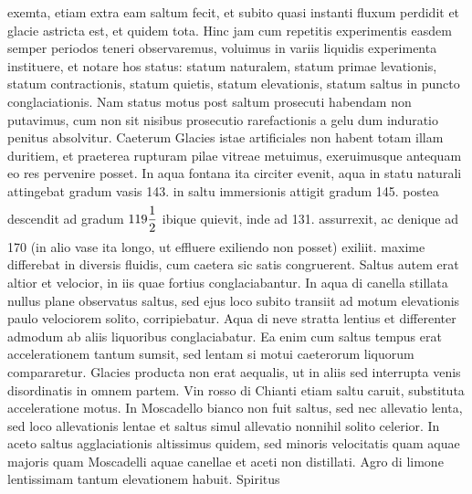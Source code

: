  exemta, etiam extra eam saltum fecit, et subito quasi instanti  fluxum perdidit et glacie astricta est, et quidem tota. Hinc jam cum  repetitis experimentis easdem semper periodos teneri observaremus, voluimus  in variis liquidis experimenta instituere, et notare hos status: statum naturalem\protect{},  statum primae levationis, statum contractionis, statum quietis, statum elevationis, statum saltus in puncto conglaciationis. Nam status motus post saltum prosecuti  habendam non putavimus, cum non sit nisibus prosecutio  rarefactionis a gelu dum induratio penitus absolvitur. Caeterum Glacies istae  artificiales non habent totam illam duritiem, et praeterea rupturam pilae\protect{}  vitreae metuimus, exeruimusque antequam eo res pervenire posset. In aqua fontana  ita circiter evenit, aqua in statu naturali\protect{} attingebat gradum vasis 143.  in saltu immersionis attigit gradum 145.  postea descendit ad gradum $\displaystyle119\frac{1}{2}\rule[-4mm]{0mm}{10mm}$ ibique  quievit, inde ad 131.  assurrexit, ac denique ad 170 (in alio vase ita longo,  ut effluere exiliendo non posset) exiliit.  maxime differebat in diversis fluidis, cum caetera sic satis congruerent. Saltus autem erat altior et velocior, in iis quae fortius  conglaciabantur. In aqua di canella stillata nullus plane observatus  saltus, sed ejus loco subito transiit ad motum elevationis paulo velociorem  solito,  corripiebatur. Aqua di neve  stratta lentius et differenter admodum ab aliis liquoribus conglaciabatur. Ea  enim cum saltus tempus erat accelerationem\protect{} tantum sumsit, sed lentam si motui caeterorum liquorum compararetur. Glacies producta non erat aequalis,  ut in aliis sed interrupta venis disordinatis in omnem partem. Vin rosso di  Chianti etiam saltu caruit, substituta acceleratione\protect{} motus. In Moscadello  bianco non fuit saltus, sed nec allevatio lenta, sed loco allevationis lentae  et saltus simul allevatio nonnihil solito celerior. In aceto\protect{}  saltus agglaciationis  altissimus quidem, sed minoris velocitatis quam aquae majoris quam Moscadelli  aquae canellae et aceti\protect{} non distillati. Agro di limone lentissimam tantum elevationem habuit. Spiritus 